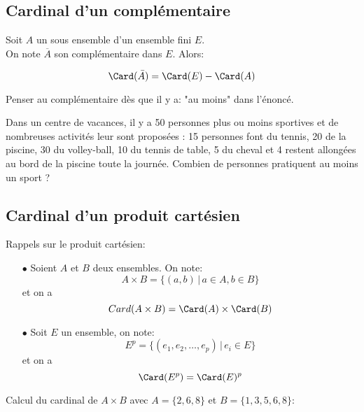 \documentclass[a4paper, 11pt]{article}
\begin{document}
\subsection{Cardinal d'un compl\'ementaire}

\begin{prop} 
Soit $A$ un sous ensemble d'un ensemble fini $E$.\\
\noindent On note $\overline{A}$ son compl\'ementaire dans $E$. Alors:

$$\Card(\bar{A}) =\Card(E) -\Card(A)$$
\end{prop}

\begin{rem}
Penser au compl\'ementaire d\`es que il y a: "au moins" dans l'énoncé. 
\end{rem}


 {\footnotesize \begin{exercice} 
Dans un centre de vacances, il y a 50 personnes plus ou moins sportives et de nombreuses activit\'es leur sont propos\'ees : 15 personnes font du tennis, 20 de la piscine, 30 du volley-ball, 10 du tennis de table, 5 du cheval et 4 restent allong\'ees au bord de la piscine toute la journ\'ee. Combien de personnes pratiquent au moins un sport ?
\end{exercice}
}


 
\subsection{Cardinal d'un produit cart\'esien}


\begin{defi} Rappels sur le produit cart\'esien:
\begin{itemize}
\item[$\bullet$] Soient $A$ et $B$ deux ensembles. On note:
$$A\times B=\{ (a,b)\,|\,  a\in A, b\in B\}$$
et on a 
$$Card(A\times B) = \Card(A)\times \Card(B)$$
\item[$\bullet$] Soit $E$ un ensemble, on note:
 $$E^p=\{ (e_1,e_2,\dots, e_p)\,|\,  e_i\in E \}$$
 et on a 
 $$\Card(E^p) = \Card(E)^p$$
\end{itemize} 
\end{defi}






\noindent \begin{exemple} 
Calcul du cardinal de $A\times B$ avec $A=\lbrace  2,6,8\rbrace$ et $B=\lbrace1,3,5,6,8\rbrace$:\\

\end{exemple}
\end{document}
